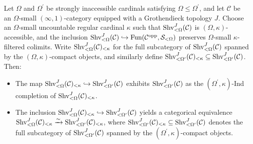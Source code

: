 \documentclass[10pt]{article}
\newcommand{\mS}{\mathcal S}
\newcommand{\C}{\mathcal C}
\theoremstyle{witharg}
\theoremstyle{witharg}
\theoremstyle{witharg2}
\begin{document}
\begin{lemma}{}\label{Change of universe and Compact Generation of Sheaf Topoi}

    Let $\Omega$ and $\Omega^\prime$ be strongly inaccessible cardinals satisfying $\Omega\leq \Omega^\prime$, and let $\C$ be an $\Omega$-small $(\infty,1)$-category equipped with a Grothendieck topology $J$. Choose an $\Omega$-small uncountable regular cardinal $\kappa$ such that $\textnormal{Shv}^J_{<\Omega}(\C)$ is $(\Omega,\kappa)$-accessible, and the inclusion $\textnormal{Shv}^J_{<\Omega}(\C)\hookrightarrow \textnormal{Fun}(\C^{\textnormal{opp}},\mS_{<\Omega})$ preserves $\Omega$-small $\kappa$-filtered colimits. Write $\textnormal{Shv}^J_{<\Omega}(\C)_{<\kappa}$ for the full subcategory of $\textnormal{Shv}^J_{<\Omega}(\C)$ spanned by the $(\Omega,\kappa)$-compact objects, and similarly define $\textnormal{Shv}^J_{<\Omega^\prime}(\C)_{<\kappa}\subseteq \textnormal{Shv}^J_{<\Omega^\prime}(\C)$. Then:

    \begin{itemize}
        \item [$(1)$] The map $\textnormal{Shv}^J_{<\Omega}(\C)_{<\kappa}\hookrightarrow \textnormal{Shv}^J_{<\Omega^\prime}(\C)$ exhibits  $\textnormal{Shv}^J_{<\Omega^\prime}(\C)$ as the $(\Omega^\prime,\kappa)$-Ind completion of $\textnormal{Shv}^J_{<\Omega}(\C)_{<\kappa}$. 
        
        \item [$(2)$] The inclusion $\textnormal{Shv}^J_{<\Omega}(\C)_{<\kappa}\hookrightarrow \textnormal{Shv}^J_{<\Omega^\prime}(\C)$ yields a categorical equivalence $\textnormal{Shv}^J_{<\Omega}(\C)_{<\kappa}\xrightarrow{\sim} \textnormal{Shv}^J_{<\Omega^\prime}(\C)_{<\kappa}$, where $\textnormal{Shv}^J_{<\Omega^\prime}(\C)_{<\kappa}\subseteq \textnormal{Shv}^J_{<\Omega^\prime}(\C)$ denotes the full subcategory of $\textnormal{Shv}^J_{<\Omega^\prime}(\C)$ spanned by the $(\Omega^\prime,\kappa)$-compact objects. 
        
        
    \end{itemize}
    
\end{lemma}
\end{document}
